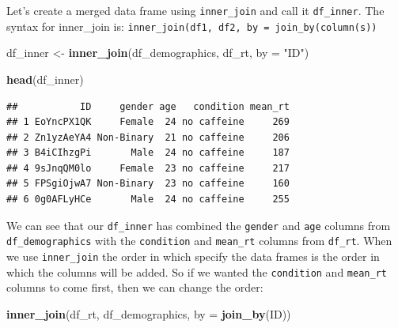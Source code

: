 \documentclass[
]{book}
\newenvironment{Shaded}{\begin{snugshade}}{\end{snugshade}}
\newcommand{\AttributeTok}[1]{\textcolor[rgb]{0.13,0.29,0.53}{#1}}
\newcommand{\FunctionTok}[1]{\textcolor[rgb]{0.13,0.29,0.53}{\textbf{#1}}}
\newcommand{\NormalTok}[1]{#1}
\newcommand{\OtherTok}[1]{\textcolor[rgb]{0.56,0.35,0.01}{#1}}
\newcommand{\StringTok}[1]{\textcolor[rgb]{0.31,0.60,0.02}{#1}}
\begin{document}
Let's create a merged data frame using \texttt{inner\_join} and call it \texttt{df\_inner}. The syntax for inner\_join is: \texttt{inner\_join(df1,\ df2,\ by\ =\ join\_by(column(s))}

\begin{Shaded}
\begin{Highlighting}[]
\NormalTok{df\_inner }\OtherTok{\textless{}{-}} \FunctionTok{inner\_join}\NormalTok{(df\_demographics, df\_rt, }\AttributeTok{by =} \StringTok{"ID"}\NormalTok{)}

\FunctionTok{head}\NormalTok{(df\_inner)}
\end{Highlighting}
\end{Shaded}

\begin{verbatim}
##           ID     gender age   condition mean_rt
## 1 EoYncPX1QK     Female  24 no caffeine     269
## 2 Zn1yzAeYA4 Non-Binary  21 no caffeine     206
## 3 B4iCIhzgPi       Male  24 no caffeine     187
## 4 9sJnqQM0lo     Female  23 no caffeine     217
## 5 FPSgiOjwA7 Non-Binary  23 no caffeine     160
## 6 0g0AFLyHCe       Male  24 no caffeine     255
\end{verbatim}

We can see that our \texttt{df\_inner} has combined the \texttt{gender} and \texttt{age} columns from \texttt{df\_demographics} with the \texttt{condition} and \texttt{mean\_rt} columns from \texttt{df\_rt}. When we use \texttt{inner\_join} the order in which specify the data frames is the order in which the columns will be added. So if we wanted the \texttt{condition} and \texttt{mean\_rt} columns to come first, then we can change the order:

\begin{Shaded}
\begin{Highlighting}[]
\FunctionTok{inner\_join}\NormalTok{(df\_rt, df\_demographics, }\AttributeTok{by =} \FunctionTok{join\_by}\NormalTok{(ID))}
\end{Highlighting}
\end{Shaded}
\end{document}
